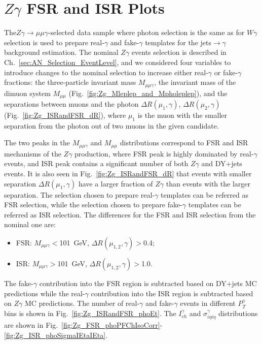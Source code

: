 \chapter{$Z\gamma$ FSR and ISR Plots}
\label{sec:ZgFSRandISRplots}

The$Z\gamma\rightarrow\mu\mu\gamma$-selected data sample where photon selection is the same as for $W\gamma$ selection is used to prepare real-$\gamma$ and fake-$\gamma$ templates for the jets$\rightarrow\gamma$ background estimation. The nominal $Z\gamma$ events selection is described in Ch.~\ref{sec:AN_Selection_EventLevel}, and we considered four variables to introduce changes to the nominal selection to increase either real-$\gamma$ or fake-$\gamma$ fractions: the three-particle invariant mass $M_{\mu\mu\gamma}$, the invariant mass of the dimuon system $M_{\mu\mu}$ (Fig.~\ref{fig:Zg_Mleplep_and_Mpholeplep}), and the separations between muons and the photon $\Delta{R}(\mu_1,\gamma)$, $\Delta{R}(\mu_2,\gamma)$ (Fig.~\ref{fig:Zg_ISRandFSR_dR}), where $\mu_1$ is the muon with the smaller separation from the photon out of two muons in the given candidate. 

The two peaks in the $M_{\mu\mu\gamma}$ and $M_{\mu\mu}$ distributions correspond to FSR and ISR mechanisms of the $Z\gamma$ production, where FSR peak is highly dominated by real-$\gamma$ events, and ISR peak contains a significant number of both $Z\gamma$ and DY+jets events. It is also seen in Fig.~\ref{fig:Zg_ISRandFSR_dR} that events with smaller separation $\Delta{R}(\mu_1,\gamma)$ have a larger fraction of $Z\gamma$ than events with the larger separation. The selection chosen to prepare real-$\gamma$ templates can be referred as FSR selection, while the selection chosen to prepare fake-$\gamma$ templates can be referred as ISR selection. The differences for the FSR and ISR selection from the nominal one are:
\begin{itemize}
  \item FSR: $M_{\mu\mu\gamma}<$101~GeV, $\Delta{R}(\mu_{1,2},\gamma)>$0.4;
  \item ISR: $M_{\mu\mu\gamma}>$101~GeV, $\Delta{R}(\mu_{1,2},\gamma)>$1.0.
\end{itemize}

The fake-$\gamma$ contribution into the FSR region is subtracted based on DY+jets MC predictions while the real-$\gamma$ contribution into the ISR region is subtracted based on $Z\gamma$ MC predictions. The number of real-$\gamma$ and fake-$\gamma$ events in different $P_T^\gamma$ bins is shown in Fig.~\ref{fig:Zg_ISRandFSR_phoEt}. The $I_{ch}^\gamma$ and $\sigma_{i \eta i \eta}^\gamma$ distributions are shown in Fig.~\ref{fig:Zg_FSR_phoPFChIsoCorr}-\ref{fig:Zg_ISR_phoSigmaIEtaIEta}.


